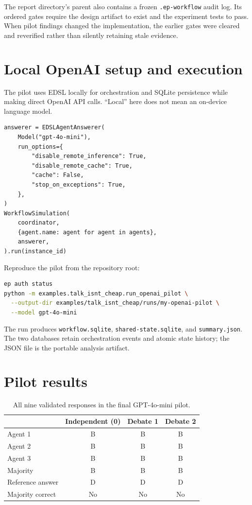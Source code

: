 \documentclass[10pt]{article}
\newcommand{\code}[1]{\texttt{#1}}
\begin{document}
The report directory's parent also contains a frozen \code{.ep-workflow} audit log. Its ordered
gates require the design artifact to exist and the experiment tests to pass. When pilot findings
changed the implementation, the earlier gates were cleared and reverified rather than silently
retaining stale evidence.

\section{Local OpenAI setup and execution}

The pilot uses EDSL locally for orchestration and SQLite persistence while making direct OpenAI API
calls. ``Local'' here does not mean an on-device language model.

\begin{lstlisting}[style=edsl]
answerer = EDSLAgentAnswerer(
    Model("gpt-4o-mini"),
    run_options={
        "disable_remote_inference": True,
        "disable_remote_cache": True,
        "cache": False,
        "stop_on_exceptions": True,
    },
)
WorkflowSimulation(
    coordinator,
    {agent.name: agent for agent in agents},
    answerer,
).run(instance_id)
\end{lstlisting}

Reproduce the pilot from the repository root:

\begin{lstlisting}[style=edsl,language=bash]
ep auth status
python -m examples.talk_isnt_cheap.run_openai_pilot \
  --output-dir examples/talk_isnt_cheap/runs/my-openai-pilot \
  --model gpt-4o-mini
\end{lstlisting}

The run produces \code{workflow.sqlite}, \code{shared-state.sqlite}, and \code{summary.json}.
The two databases retain orchestration events and atomic state history; the JSON file is the portable
analysis artifact.

\section{Pilot results}

\begin{table}[h]
\centering
\begin{tabular}{lccc}
\toprule
 & Independent (0) & Debate 1 & Debate 2 \\
\midrule
Agent 1 & B & B & B \\
Agent 2 & B & B & B \\
Agent 3 & B & B & B \\
Majority & B & B & B \\
Reference answer & D & D & D \\
Majority correct & No & No & No \\
\bottomrule
\end{tabular}
\caption{All nine validated responses in the final GPT-4o-mini pilot.}
\end{table}
\end{document}

